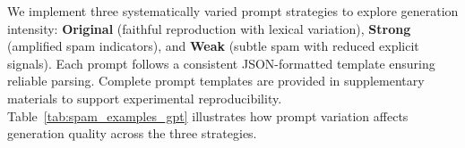 We implement three systematically varied prompt strategies to explore generation intensity: \textbf{Original} (faithful reproduction with lexical variation), \textbf{Strong} (amplified spam indicators), and \textbf{Weak} (subtle spam with reduced explicit signals). Each prompt follows a consistent JSON-formatted template ensuring reliable parsing. Complete prompt templates are provided in supplementary materials to support experimental reproducibility. Table~\ref{tab:spam_examples_gpt} illustrates how prompt variation affects generation quality across the three strategies.\footnotemark[3]


\vspace{0.5em}
\noindent{}
\vspace{0.5em}


